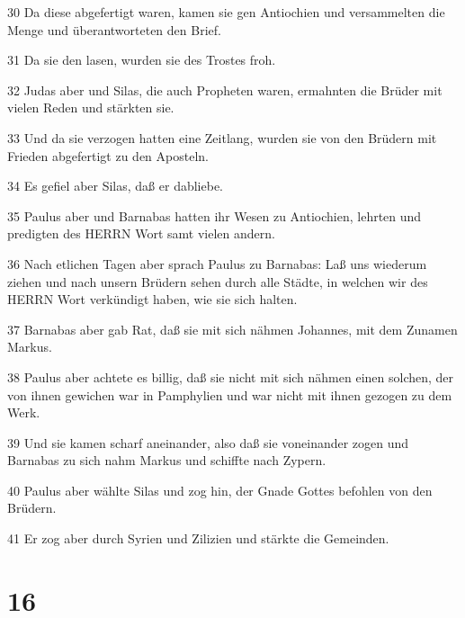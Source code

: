 \par 30 Da diese abgefertigt waren, kamen sie gen Antiochien und versammelten die Menge und überantworteten den Brief.
\par 31 Da sie den lasen, wurden sie des Trostes froh.
\par 32 Judas aber und Silas, die auch Propheten waren, ermahnten die Brüder mit vielen Reden und stärkten sie.
\par 33 Und da sie verzogen hatten eine Zeitlang, wurden sie von den Brüdern mit Frieden abgefertigt zu den Aposteln.
\par 34 Es gefiel aber Silas, daß er dabliebe.
\par 35 Paulus aber und Barnabas hatten ihr Wesen zu Antiochien, lehrten und predigten des HERRN Wort samt vielen andern.
\par 36 Nach etlichen Tagen aber sprach Paulus zu Barnabas: Laß uns wiederum ziehen und nach unsern Brüdern sehen durch alle Städte, in welchen wir des HERRN Wort verkündigt haben, wie sie sich halten.
\par 37 Barnabas aber gab Rat, daß sie mit sich nähmen Johannes, mit dem Zunamen Markus.
\par 38 Paulus aber achtete es billig, daß sie nicht mit sich nähmen einen solchen, der von ihnen gewichen war in Pamphylien und war nicht mit ihnen gezogen zu dem Werk.
\par 39 Und sie kamen scharf aneinander, also daß sie voneinander zogen und Barnabas zu sich nahm Markus und schiffte nach Zypern.
\par 40 Paulus aber wählte Silas und zog hin, der Gnade Gottes befohlen von den Brüdern.
\par 41 Er zog aber durch Syrien und Zilizien und stärkte die Gemeinden.

\chapter{16}

